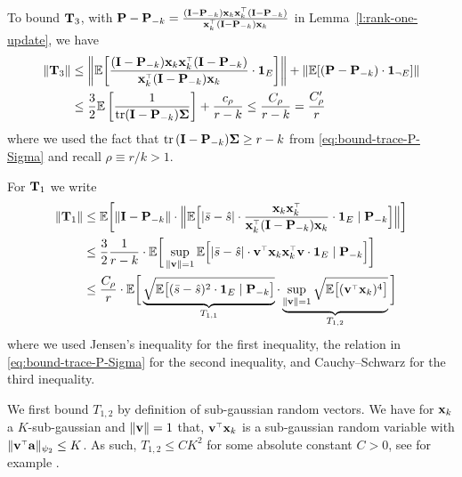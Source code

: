 \documentclass[thesis.tex]{subfiles}
\begin{document}
To bound $\mathbf{T}_3$, with $\P - \P_{-k} = \frac{(\I - \P_{-k})\x_k\x_k^\top (\I - \P_{-k})}{\x_k^\top (\I - \P_{-k}) \x_k}$ in Lemma~\ref{l:rank-one-update}, we have
\begin{align*}
\|\T_3\| &\leq  \bigg\|
  \E\bigg[\frac{ (\I - \P_{-k}) \x_k\x_k^\top (\I - \P_{-k})}{\x_k^\top (\I - \P_{-k}) \x_k}
  \cdot \one_E \bigg]\bigg\|  + \| \E[ (\P - \P_{-k}) \cdot \one_{\neg E} ] \| \\ 
  &\le \frac32 \E \left[ \frac1{ \tr (\I - \P_{-k} ) \Sigmab } \right] + \frac{c_\rho}{r - k} \leq \frac{C_\rho}{r-k} = \frac{C'_\rho}{r}
\end{align*}
where we used the fact that $\mathrm{tr}\,(\mathbf I - \mathbf P_{-k}) \mathbf{\Sigma} \ge r -k $ from \eqref{eq:bound-trace-P-Sigma} and recall $\rho \equiv r/k > 1$.


For $\mathbf{T}_1$ we write
\begin{align*}
  \|\T_1\|    &\leq\E\bigg[\|\I - \P_{-k}\|\cdot \Big\|\E\Big[|\bar s-\hat s|\cdot
    \frac{\x_k\x_k^\top}{\x_k^\top( \I - \P_{-k}) \x_k} \cdot \one_E\mid\P_{-k}\Big]
    \Big\|\bigg]
  \\
          &\leq \frac32 \frac1{r-k} \cdot \E\bigg[\sup_{\| \v \| = 1}\E\Big[
            |\bar s-\hat s|\cdot \v^\top\x_k\x_k^\top\v\cdot\one_E\mid
            \P_{-k}\Big]\bigg]
  \\
  &\leq \frac{C_\rho}{r}\cdot \E\bigg[\underbrace{\sqrt{\E\big[(\bar s-\hat
    s)^2\cdot \one_E \mid\P_{-k}\big]}}_{ T_{1,1} }\cdot
    \underbrace{\sup_{ \| \v \| = 1 }\sqrt{\E\big[(\v^\top\x_k)^4\big]}}_{ T_{1,2} }\bigg]
\end{align*}
where we used Jensen's inequality for the first inequality, the relation in \eqref{eq:bound-trace-P-Sigma} for the second inequality, and Cauchy–Schwarz for the third inequality.

We first bound $T_{1,2}$ by definition of sub-gaussian random
vectors. We have for $\mathbf x_k$ a $K$-sub-gaussian and $\| \mathbf v \| = 1$
that, $\v^\top \x_k$ is a sub-gaussian random variable with $\|\v^\top
\a \|_{\psi_2} \leq K$. As such, $T_{1,2} \le C K^2$ for some absolute
constant $C > 0$, see for example
\cite[Section~2.5.2]{vershynin2018high}. 
\end{document}
